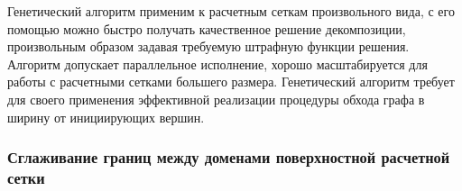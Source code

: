 
Генетический алгоритм применим к расчетным сеткам произвольного вида, с его помощью можно быстро получать качественное решение декомпозиции, произвольным образом задавая требуемую штрафную функции решения.
Алгоритм допускает параллельное исполнение, хорошо масштабируется для работы с расчетными сетками большего размера.
Генетический алгоритм требует для своего применения эффективной реализации процедуры обхода графа в ширину от инициирующих вершин.

\subsubsection{Сглаживание границ между доменами поверхностной \mbox{расчетной} сетки}\label{sec:text_2_smooth}

